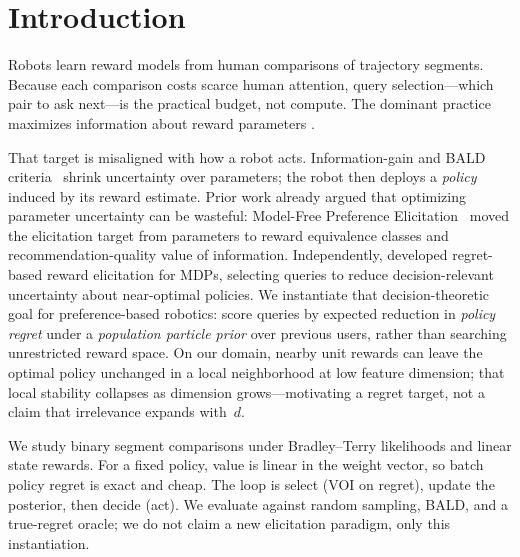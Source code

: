 \section{Introduction}
\label{sec:introduction}

Robots learn reward models from human comparisons of trajectory segments.
Because each comparison costs scarce human attention, query selection---which pair to
ask next---is the practical budget, not compute.
The dominant practice maximizes information about reward parameters
\citep{sadigh2017active,biyik2019asking}.

That target is misaligned with how a robot acts.
Information-gain and BALD criteria~\citep{houlsby2011bald} shrink uncertainty over
parameters; the robot then deploys a \emph{policy} induced by its reward estimate.
Prior work already argued that optimizing parameter uncertainty can be wasteful:
Model-Free Preference Elicitation~\citep{modelfree2024} moved the elicitation target
from parameters to reward equivalence classes and recommendation-quality value of
information.
Independently, \citet{regan2009regret} developed regret-based reward elicitation for
MDPs, selecting queries to reduce decision-relevant uncertainty about near-optimal
policies.
We instantiate that decision-theoretic goal for preference-based robotics: score
queries by expected reduction in \emph{policy regret} under a \emph{population particle
prior} over previous users, rather than searching unrestricted reward space.
On our domain, nearby unit rewards can leave the optimal policy unchanged in a local
neighborhood at low feature dimension; that local stability collapses as dimension
grows---motivating a regret target, not a claim that irrelevance expands with~$d$.

We study binary segment comparisons under Bradley--Terry likelihoods and linear state
rewards. For a fixed policy, value is linear in the weight vector, so batch policy
regret is exact and cheap.
The loop is select (VOI on regret), update the posterior, then decide (act).
We evaluate against random sampling, BALD, and a true-regret oracle; we do not claim a
new elicitation paradigm, only this instantiation.

